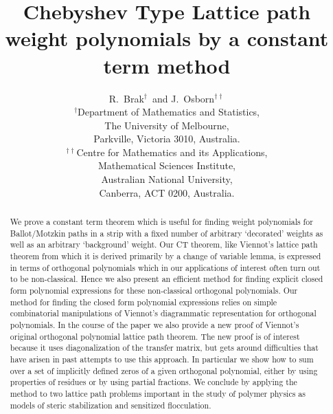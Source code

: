 \documentclass[11pt,a4paper]{article}
\begin{document}
%
%

\title{Chebyshev Type Lattice path weight polynomials by a constant term method}
\author{R.~Brak${}^\dag$\ and J.~Osborn${}^{\dag\dag}$\\
${}^\dag$Department of Mathematics and Statistics,\\
The University of Melbourne,\\
Parkville, Victoria 3010, Australia.\\
${}^{\dag\dag}$Centre for Mathematics and its Applications, \\
Mathematical Sciences Institute,\\
Australian National University, \\ 
Canberra, ACT 0200, Australia.
}  





\maketitle

\begin{abstract}
We prove a constant term theorem which is useful for finding weight
polynomials for Ballot/Motzkin paths in a strip with a fixed number of
arbitrary `decorated' weights as well as an arbitrary `background'
weight.
Our CT theorem, like Viennot's lattice path theorem from which it is
derived primarily by a change of variable lemma,  is expressed in
terms of orthogonal polynomials which in our applications of interest
often turn out to be non-classical.
Hence we also present an efficient method for finding explicit closed
form polynomial expressions for these non-classical orthogonal
polynomials.
Our method for finding the closed form polynomial expressions relies
on simple combinatorial manipulations of  Viennot's diagrammatic
representation for orthogonal polynomials.
In the course of the paper we also provide a new proof of Viennot's
original orthogonal polynomial lattice path theorem.  The new proof is
of interest because it uses diagonalization of the transfer matrix,
but gets around difficulties that have arisen in past attempts to use
this approach.  In particular we show how to sum over a set of
implicitly defined zeros of a given orthogonal polynomial, either by
using properties of residues or by using partial fractions.
We conclude by applying the method to two lattice path problems
important in the study of  polymer physics as models of steric
stabilization and sensitized flocculation.

\end{abstract}
\end{document}
